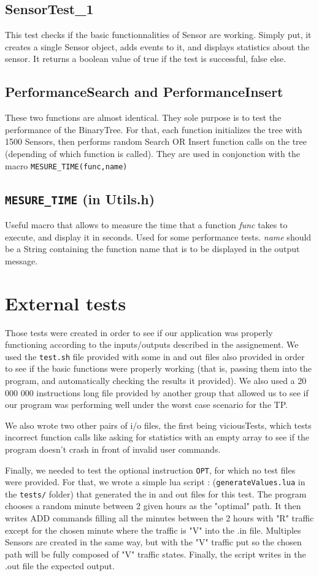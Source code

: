 \documentclass[10pt]{article}
\begin{document}
\subsection{SensorTest\_1}
This test checks if the basic functionnalities of Sensor are working. Simply put, it creates a single Sensor object, adds events to it, and displays statistics about the sensor. It returns a boolean value of true if the test is successful, false else.

\subsection{PerformanceSearch and PerformanceInsert}
These two functions are almost identical. They sole purpose is to test the performance of the BinaryTree. For that, each function initializes the tree with 1500 Sensors, then performs random Search OR Insert function calls on the tree (depending of which function is called). They are used in conjonction with the macro \texttt{MESURE\_TIME(func,name)}

\subsection{\texttt{MESURE\_TIME} (in Utils.h)}
Useful macro that allows to measure the time that a function \emph{func} takes to execute, and display it in seconds. Used for some performance tests. \emph{name} should be a String containing the function name that is to be displayed in the output message.

\section{External tests}
Those tests were created in order to see if our application was properly functioning according to the inputs/outputs described in the assignement. We used the \texttt{test.sh} file provided with some in and out files also provided in order to see if the basic functions were properly working (that is, passing them into the program, and automatically checking the results it provided). We also used a 20 000 000 instructions long file provided by another group that allowed us to see if our program was performing well under the worst case scenario for the TP.

We also wrote two other pairs of i/o files, the first being viciousTests, which tests incorrect function calls like asking for statistics with an empty array to see if the program doesn't crash in front of invalid user commands.

Finally, we needed to test the optional instruction \texttt{OPT}, for which no test files were provided. For that, we wrote a simple lua script : (\texttt{generateValues.lua} in the \texttt{tests/} folder) that generated the in and out files for this test. The program chooses a random minute between 2 given hours as the "optimal" path. It then writes ADD commands filling all the minutes between the 2 hours with "R" traffic except for the chosen minute where the traffic is "V" into the .in file. Multiples Sensors are created in the same way, but with the "V" traffic put so the chosen path will be fully composed of "V" traffic states. Finally, the script writes in the .out file the expected output.
\end{document}
